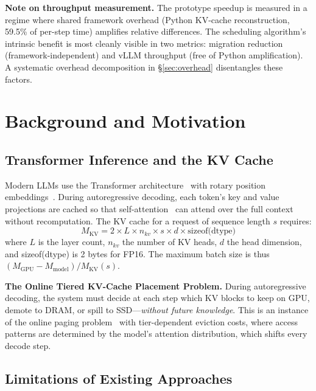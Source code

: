 \documentclass[conference]{IEEEtran}
\begin{document}
\textbf{Note on throughput measurement.} The prototype speedup is measured in a regime where shared framework overhead (Python KV-cache reconstruction, 59.5\% of per-step time) amplifies relative differences. The scheduling algorithm's intrinsic benefit is most cleanly visible in two metrics: migration reduction (framework-independent) and vLLM throughput (free of Python amplification). A systematic overhead decomposition in \S\ref{sec:overhead} disentangles these factors.

\section{Background and Motivation}
\subsection{Transformer Inference and the KV Cache}

Modern LLMs use the Transformer architecture~\cite{transformer} with rotary position embeddings~\cite{rope}. During autoregressive decoding, each token's key and value projections are cached so that self-attention~\cite{transformer} can attend over the full context without recomputation. The KV cache for a request of sequence length $s$ requires:
\begin{equation}
M_{\text{KV}} = 2 \times L \times n_{kv} \times s \times d \times \text{sizeof(dtype)}
\label{eq:kv-mem}
\end{equation}
where $L$ is the layer count, $n_{kv}$ the number of KV heads, $d$ the head dimension, and sizeof(dtype) is 2 bytes for FP16. The maximum batch size is thus $(M_{\text{GPU}} - M_{\text{model}}) / M_{\text{KV}}(s)$.

\textbf{The Online Tiered KV-Cache Placement Problem.} During autoregressive decoding, the system must decide at each step which KV blocks to keep on GPU, demote to DRAM, or spill to SSD---\emph{without future knowledge}. This is an instance of the online paging problem~\cite{sleator-tarjan} with tier-dependent eviction costs, where access patterns are determined by the model's attention distribution, which shifts every decode step.

\subsection{Limitations of Existing Approaches}
\end{document}
